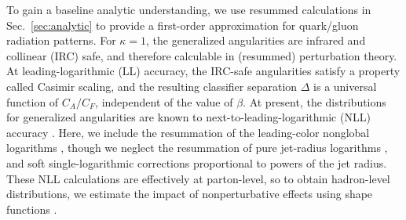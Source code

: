 \documentclass[11pt,letterpaper]{article}
\DeclareRobustCommand{\Sec}[1]{Sec.~\ref{#1}}
\begin{document}
To gain a baseline analytic understanding, we use resummed
calculations in \Sec{sec:analytic} to provide a first-order
approximation for quark/gluon radiation patterns.  For $\kappa = 1$,
the generalized angularities are infrared and collinear (IRC) safe,
and therefore calculable in (resummed) perturbation theory.  At
leading-logarithmic (LL) accuracy, the IRC-safe angularities satisfy a
property called Casimir scaling, and the resulting classifier
separation $\Delta$ is a universal function of $C_A/C_F$, independent
of the value of $\beta$.  At present, the distributions for
generalized angularities are known to next-to-leading-logarithmic
(NLL) accuracy \cite{Larkoski:2013eya,Larkoski:2014pca}.  Here, we
include the resummation of the leading-color nonglobal logarithms
\cite{Dasgupta:2001sh}, though we neglect the resummation of pure
jet-radius logarithms \cite{Dasgupta:2014yra}, and soft
single-logarithmic corrections proportional to powers of the jet
radius.  These NLL calculations are effectively at parton-level, so to
obtain hadron-level distributions, we estimate the impact of
nonperturbative effects using shape functions
\cite{Korchemsky:1999kt,Korchemsky:2000kp}.
\end{document}
